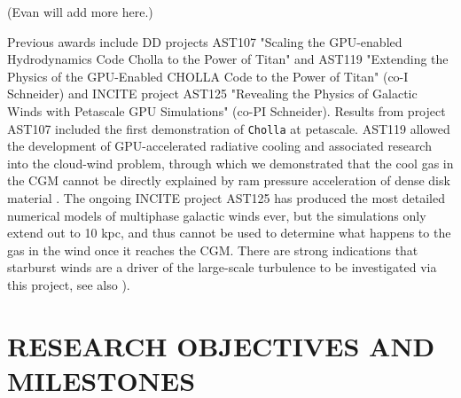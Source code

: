 \documentclass[11pt,letterpaper,english]{article}
\begin{document}

(Evan will add more here.)

Previous awards include DD projects AST107 "Scaling the GPU-enabled Hydrodynamics Code Cholla to the Power of Titan" and AST119 "Extending the Physics of the GPU-Enabled CHOLLA Code to the Power of Titan" (co-I Schneider) and INCITE project AST125 "Revealing the Physics of Galactic Winds with Petascale GPU Simulations" (co-PI Schneider). Results from project AST107 included the first demonstration of {\tt Cholla} at petascale. AST119 allowed the development of GPU-accelerated radiative cooling and associated research into the cloud-wind problem, through which we demonstrated that the cool gas in the CGM cannot be directly explained by ram pressure acceleration of dense disk material \cite{Schneider17}. The ongoing INCITE project AST125 has produced the most detailed numerical models of multiphase galactic winds ever, but the simulations only extend out to 10 kpc, and thus cannot be used to determine what happens to the gas in the wind once it reaches the CGM. There are strong indications that starburst winds are a driver of the large-scale turbulence to be investigated via this project, see also \cite{Fielding17}).


\vspace{-.25in}
\section{RESEARCH OBJECTIVES AND MILESTONES }  
\vspace{-.2in}


\end{document}
